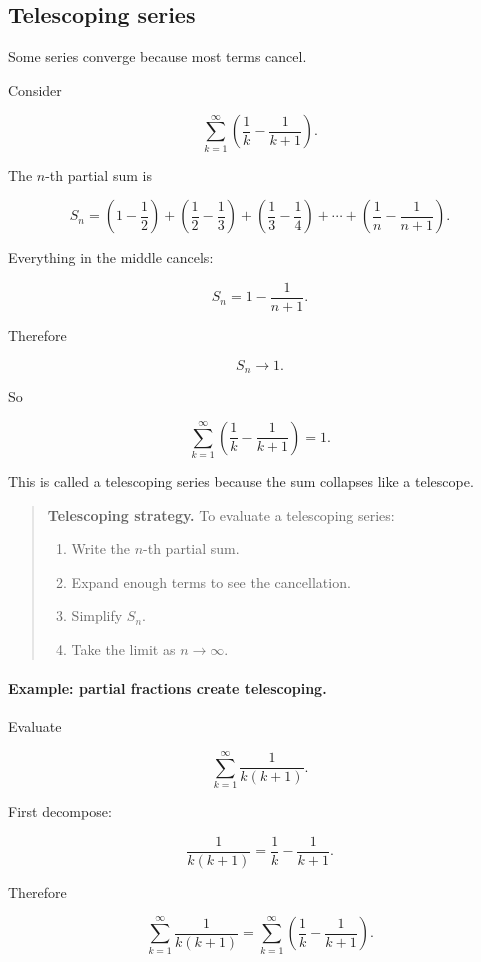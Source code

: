 \subsection{Telescoping series}
\label{subsec:telescoping-series}

Some series converge because most terms cancel.

Consider

\[
\sum_{k=1}^{\infty}\left(\frac1k-\frac1{k+1}\right).
\]

The \(n\)-th partial sum is

\[
S_n
=
\left(1-\frac12\right)
+
\left(\frac12-\frac13\right)
+
\left(\frac13-\frac14\right)
+\cdots+
\left(\frac1n-\frac1{n+1}\right).
\]

Everything in the middle cancels:

\[
S_n=1-\frac1{n+1}.
\]

Therefore

\[
S_n\to1.
\]

So

\[
\boxed{
\sum_{k=1}^{\infty}\left(\frac1k-\frac1{k+1}\right)=1.
}
\]

This is called a telescoping series because the sum collapses like a telescope.

\begin{quote}
\textbf{Telescoping strategy.}
To evaluate a telescoping series:

\begin{enumerate}
\item Write the \(n\)-th partial sum.
\item Expand enough terms to see the cancellation.
\item Simplify \(S_n\).
\item Take the limit as \(n\to\infty\).
\end{enumerate}
\end{quote}

\paragraph{Example: partial fractions create telescoping.}
Evaluate

\[
\sum_{k=1}^{\infty}\frac1{k(k+1)}.
\]

First decompose:

\[
\frac1{k(k+1)}
=
\frac1k-\frac1{k+1}.
\]

Therefore

\[
\sum_{k=1}^{\infty}\frac1{k(k+1)}
=
\sum_{k=1}^{\infty}\left(\frac1k-\frac1{k+1}\right).
\]

